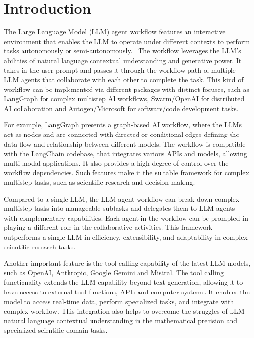 \section{Introduction}
The Large Language Model (LLM) agent workflow features an interactive environment that enables the LLM to operate under different contexts to perform tasks autonomously or semi-autonomously.~\cite{langgraph,Swarm_openai,wu2023autogen, wang2023plan}
The workflow leverages the LLM's abilities of natural language contextual understanding and generative power. 
It takes in the user prompt and passes it through the workflow path of multiple LLM agents that collaborate with each other to complete the task. 
This kind of workflow can be implemented via different packages with distinct focuses, such as LangGraph for complex multistep AI workflows, Swarm/OpenAI for distributed AI collaboration and Autogen/Microsoft for software/code development tasks.~\cite{wu2023autogen}


For example, LangGraph presents a graph-based AI workflow, where the LLMs act as nodes and are connected with directed or conditional edges defining the data flow and relationship between different models.  
The workflow is compatible with the LangChain codebase, that integrates various APIs and models, allowing multi-modal applications. 
It also provides a high degree of control over the workflow dependencies. 
Such features make it the suitable framework for complex multistep tasks, such as scientific research and decision-making. 


Compared to a single LLM, the LLM agent workflow can break down complex multistep tasks into manageable subtasks and delegates them to LLM agents with complementary capabilities. 
Each agent in the workflow can be prompted in playing a different role in the collaborative activities. 
This framework outperforms a single LLM in efficiency, extensibility, and adaptability in complex scientific research tasks. 


Another important feature is the tool calling capability of the latest LLM models, such as OpenAI, Anthropic, Google Gemini and Mistral. 
The tool calling functionality extends the LLM capability beyond text generation, allowing it to have access to external tool functions, APIs and computer systems. \cite{schick2024toolformer}
It enables the model to access real-time data, perform specialized tasks, and integrate with complex workflow. 
This integration also helps to overcome the struggles of LLM natural language contextual understanding in the mathematical precision and specialized scientific domain tasks. 



